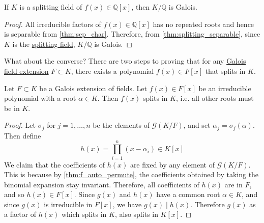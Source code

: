   \begin{corollary}
    \label{thm:splitting-fields-of-q-are-automatically-galois}
    If $K$ is a splitting field of $f(x) \in \mathbb{Q}[x]$, then $K/\mathbb{Q}$ is Galois. 
  \end{corollary}
  \begin{proof}
    All irreducible factors of $f(x) \in \mathbb{Q}[x]$ has no repeated roots and hence is separable from \ref{thm:sep_char}. Therefore, from \ref{thm:splitting_separable}, since $K$ is the \hyperref[def:splitting-field]{splitting field}, $K/\mathbb{Q}$ is Galois. 
  \end{proof}

  What about the converse? There are two steps to proving that for any \hyperref[def:galois-field-extension]{Galois field extension} $F \subset K$, there exists a polynomial $f(x) \in F[x]$ that splits in $K$. 

  \begin{lemma} 
    \label{thm:6.9}
    Let $F \subset K$ be a Galois extension of fields. Let $f(x) \in F[x]$ be an irreducible polynomial with a root $\alpha \in K$. Then $f(x)$ splits in $K$, i.e. all other roots must be in $K$.  
  \end{lemma} 
  \begin{proof}
    Let $\sigma_j$ for $j = 1, \ldots, n$ be the elements of $\mathcal{G}(K/F)$, and set $\alpha_j = \sigma_j (\alpha)$. Then define 
    \begin{equation}
      h(x) = \prod_{i=1}^n (x - \alpha_i)  \in K[x]
    \end{equation}
    We claim that the coefficients of $h(x)$ are fixed by any element of $\mathcal{G}(K/F)$. This is because by \ref{thm:f_auto_permute}, the coefficients obtained by taking the binomial expansion stay invariant. Therefore, all coefficients of $h(x)$ are in $F$, and so $h(x) \in F[x]$. Since $g(x)$ and $h(x)$ have a common root $\alpha \in K$, and since $g(x)$ is irreducible in $F[x]$, we have $g(x) \mid h(x)$. Therefore $g(x)$ as a factor of $h(x)$ which splits in $K$, also splits in $K[x]$. 
  \end{proof}


